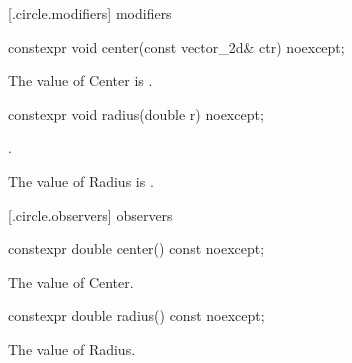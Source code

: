  [\iotwod.circle.modifiers]{ modifiers}

\begin{itemdecl}
constexpr void center(const vector_2d& ctr) noexcept;
\end{itemdecl}

\begin{itemdescr}
\pnum
\effects
The value of Center is .
\end{itemdescr}

\begin{itemdecl}
constexpr void radius(double r) noexcept;
\end{itemdecl}
\begin{itemdescr}
\requires
{}.

\pnum
\effects
The value of Radius is .
\end{itemdescr}

 [\iotwod.circle.observers]{ observers}

\begin{itemdecl}
constexpr double center() const noexcept;
\end{itemdecl}
\begin{itemdescr}
\pnum
\returns
The value of Center.
\end{itemdescr}

\begin{itemdecl}
constexpr double radius() const noexcept;
\end{itemdecl}
\begin{itemdescr}
\pnum
\returns
The value of Radius.
\end{itemdescr}
